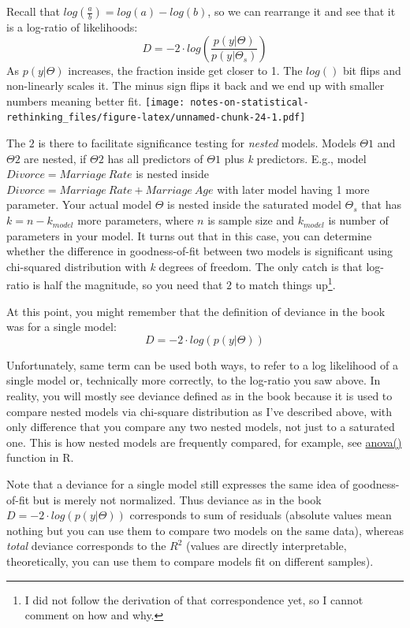 \documentclass[
]{book}
\begin{document}
Recall that \(log(\frac{a}{b}) = log(a) - log(b)\), so we can rearrange it and see that it is a log-ratio of likelihoods:
\[D = -2 \cdot  log \left(\frac{p(y|\Theta)}{p(y|\Theta_s)}\right)\]
As \(p(y|\Theta)\) increases, the fraction inside get closer to 1. The \(log()\) bit flips and non-linearly scales it. The minus sign flips it back and we end up with smaller numbers meaning better fit.
\texttt{[image: notes-on-statistical-rethinking\_files/figure-latex/unnamed-chunk-24-1.pdf]}

The \(2\) is there to facilitate significance testing for \emph{nested} models. Models \(\Theta1\) and \(\Theta2\) are nested, if \(\Theta2\) has all predictors of \(\Theta1\) plus \emph{k} predictors. E.g., model \(Divorce = Marriage~Rate\) is nested inside \(Divorce = Marriage~Rate + Marriage~Age\) with later model having 1 more parameter. Your actual model \(\Theta\) is nested inside the saturated model \(\Theta_s\) that has \(k = n - k_{model}\) more parameters, where \(n\) is sample size and \(k_{model}\) is number of parameters in your model. It turns out that in this case, you can determine whether the difference in goodness-of-fit between two models is significant using chi-squared distribution with \emph{k} degrees of freedom. The only catch is that log-ratio is half the magnitude, so you need that \(2\) to match things up\footnote{I did not follow the derivation of that correspondence yet, so I cannot comment on how and why.}.

At this point, you might remember that the definition of deviance in the book was for a single model:
\[D = -2 \cdot log(p(y|\Theta))\]

Unfortunately, same term can be used both ways, to refer to a log likelihood of a single model or, technically more correctly, to the log-ratio you saw above. In reality, you will mostly see deviance defined as in the book because it is used to compare nested models via chi-square distribution as I've described above, with only difference that you compare any two nested models, not just to a saturated one. This is how nested models are frequently compared, for example, see \href{https://stat.ethz.ch/R-manual/R-patched/library/stats/html/anova.html}{anova()} function in R.

Note that a deviance for a single model still expresses the same idea of goodness-of-fit but is merely not normalized. Thus deviance as in the book \(D = -2 \cdot log(p(y|\Theta))\) corresponds to sum of residuals (absolute values mean nothing but you can use them to compare two models on the same data), whereas \emph{total} deviance corresponds to the \(R^2\) (values are directly interpretable, theoretically, you can use them to compare models fit on different samples).
\end{document}
